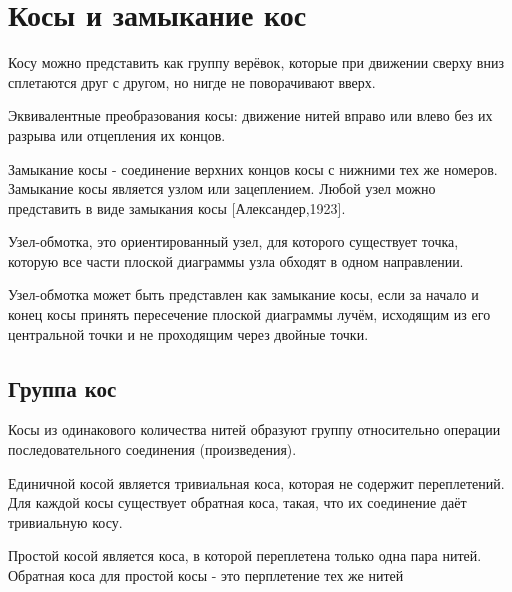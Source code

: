 \section{Косы и замыкание кос}

Косу можно представить как группу верёвок, которые при движении сверху вниз сплетаются друг с другом, но нигде не поворачивают вверх.

Эквивалентные преобразования косы: движение нитей вправо или влево без их разрыва или отцепления их концов.

Замыкание косы - соединение верхних концов косы с нижними тех же номеров. Замыкание косы является узлом или зацеплением.
Любой узел можно представить в виде замыкания косы [Александер,1923].

Узел-обмотка, это ориентированный узел, для которого существует точка, которую все части плоской диаграммы узла обходят в одном направлении.

Узел-обмотка может быть представлен как замыкание косы, если за начало и конец косы принять пересечение плоской диаграммы лучём, исходящим из его центральной точки и не проходящим через двойные точки.

\subsection{Группа кос}

Косы из одинакового количества нитей образуют группу относительно операции последовательного соединения (произведения).

Единичной косой является тривиальная коса, которая не содержит переплетений. Для каждой косы существует обратная коса, такая, что их соединение даёт тривиальную косу.

Простой косой является коса, в которой переплетена только одна пара нитей. Обратная коса для простой косы - это перплетение тех же нитей